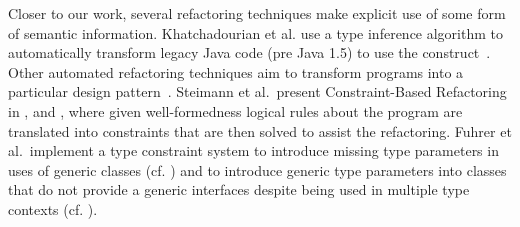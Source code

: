 \documentclass[sigconf,review,anonymous]{acmart}
\begin{document}
Closer to our work, several refactoring techniques make explicit use of some form of semantic information.
Khatchadourian et al. use a type inference algorithm to automatically transform legacy Java code (pre Java 1.5) to use the  construct~\cite{sawin}.
Other automated refactoring techniques aim to transform programs into a particular design pattern~\cite{chris,bae}.
%
%
%
%
Steimann et al.~present Constraint-Based Refactoring in \cite{Steimann2011},
\cite{Steimann2012Pilgrim} and \cite{Steimann2011KollePilgrim},
where given well-formedness logical rules about the program are translated into constraints that are then solved to assist the refactoring.
%
Fuhrer et al.~implement a type constraint system to introduce missing type
parameters in uses of generic classes (cf. \cite{DBLP:conf/ecoop/FuhrerTKDK05})
and to introduce generic type parameters into classes that do not provide
a generic interfaces despite being used in multiple type contexts
(cf. \cite{DBLP:conf/icse/KiezunETF07}).
%
%
\end{document}
